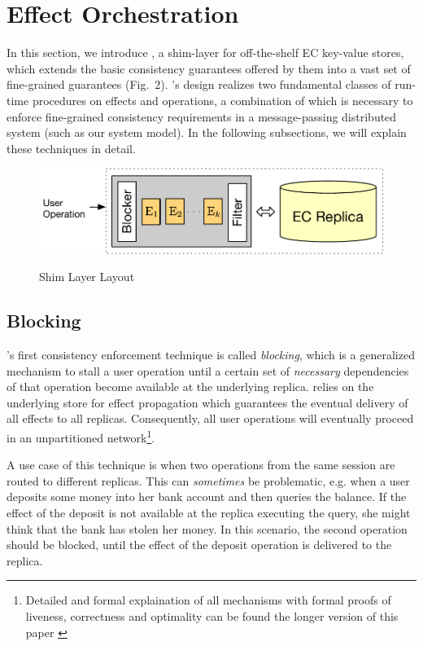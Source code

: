 \documentclass[authorversion]{sig-alternate-05-2015}
\begin{document}
\section{Effect Orchestration}
In this section, we introduce \tool, a shim-layer for off-the-shelf EC key-value stores, 
which extends the basic consistency guarantees offered by them into a vast set of 
fine-grained guarantees (Fig.~2).
\tool's design realizes two fundamental classes of run-time procedures on effects and operations, 
a combination of which is necessary to enforce fine-grained consistency requirements in a message-passing distributed system (such as our system model). In the following subsections, we will explain these techniques in detail.
\begin{figure}[h]
\centering
\includegraphics[scale=0.5]{Figures/shimlayer.pdf}
\label{fig:shim}
\caption{Shim Layer Layout}
\end{figure}

\subsection{Blocking}
\tool's first consistency enforcement technique is called \emph{blocking},
which is a generalized mechanism to stall a user operation until a certain set 
of \emph{necessary} dependencies of that operation become available at the underlying replica. 
\tool\; relies on the underlying store for effect propagation which guarantees the eventual delivery of all 
effects to all replicas. Consequently, all user operations will eventually proceed in an unpartitioned 
network\footnote{Detailed and formal explaination of all mechanisms with formal proofs of 
liveness, correctness and optimality can be found the longer version of this paper \cite{syncope}}. 

A use case of this technique is when two operations from the same session are routed to different replicas.
This can \emph{sometimes} be problematic, e.g. when a user deposits some money into her bank account and then queries the 
balance. If the effect of the deposit is not available at the replica executing the query, 
she might think that the bank has stolen her money.
In this scenario, the second operation should be blocked, 
until the effect of the deposit operation is delivered to the replica. 
\end{document}
